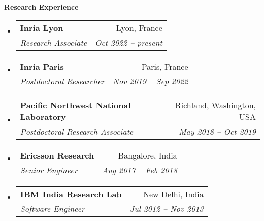 \documentclass[letterpaper,11pt]{article}
\makeatletter
\newcommand{\resheading}[1]{{\large \colorbox{mygrey}{\begin{minipage}{\textwidth}{\textbf{#1 \vphantom{p\^{E}}}}\end{minipage}}}}
\newcommand{\ressubheading}[4]{
\begin{tabular*}{6.5in}{l@{\extracolsep{\fill}}r}
		\textbf{#1} & #2 \\
		\textit{#3} & \textit{#4} \\
\end{tabular*}\vspace{-6pt}}
\makeatother
\begin{document}
\vspace{0.1in} 
\resheading{Research Experience}
\begin{itemize}
	\item \ressubheading{{Inria Lyon}}{Lyon, France}{{Research Associate}}{Oct 2022 -- present} \newline
	\item \ressubheading{{Inria Paris}}{Paris, France}{{Postdoctoral Researcher}}{Nov 2019 -- Sep 2022} \newline
	
	\item \ressubheading{{Pacific Northwest National Laboratory}}{Richland, Washington, USA}{{Postdoctoral Research Associate}}{May 2018 -- Oct 2019} \newline
	
	\item \ressubheading{{Ericsson Research}}{Bangalore, India}{{Senior Engineer}}{Aug 2017 -- Feb 2018} \newline
	
	\item \ressubheading{{IBM India Research Lab}}{New Delhi, India}{{Software Engineer}}{Jul 2012 -- Nov 2013} \newline
	

	
\end{itemize}
\end{document}
